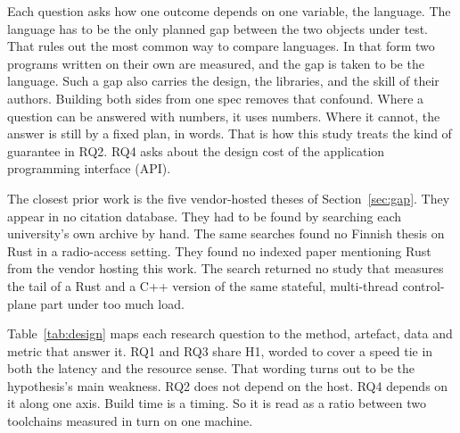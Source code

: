 \documentclass[english,oneside,a4paper,censored,csm,software-track-2020]{HYthesisML}
\begin{document}
Each question asks how one outcome depends on one variable, the language. The
language has to be the only planned gap between the two objects under test.
That rules out the most common way to compare languages. In that form two
programs written on their own are measured, and the gap is taken to be the
language. Such a gap also carries the design, the libraries, and the skill of
their authors. Building both sides from one spec removes that confound. Where
a question can be answered with numbers, it uses numbers. Where it cannot, the
answer is still by a fixed plan, in words. That is how this study treats the
kind of guarantee in RQ2. RQ4 asks about the design cost of the application
programming interface (API).

The closest prior work is the five vendor-hosted theses of
Section~\ref{sec:gap}. They appear in no citation database. They had to be
found by searching each university's own archive by hand. The same searches
found no Finnish thesis on Rust in a radio-access setting. They found no
indexed paper mentioning Rust from the vendor hosting this work. The search
returned no study that measures the tail of a Rust and a C++ version of the
same stateful, multi-thread control-plane part under too much load.

Table~\ref{tab:design} maps each research question to the method, artefact,
data and metric that answer it. RQ1 and RQ3 share H1, worded to cover a speed
tie in both the latency and the resource sense. That wording turns out to be the
hypothesis's main weakness. RQ2 does not depend on the host. RQ4 depends on it
along one axis. Build time is a timing. So it is read as a ratio between two
toolchains measured in turn on one machine.
\end{document}
